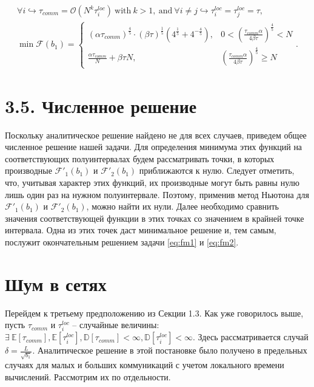 \documentclass{article}
\theoremstyle{definition}
\theoremstyle{plain}
\begin{document}
\begin{itemize}
\begin{equation}
    \label{eq:temp404}
    \begin{split}
    \forall i  \hookrightarrow \tau_{comm} = \mathcal{O}( N^k \tau_i^{loc}) ~\text{with}~ k >1 , ~\text{and}~ \forall i\neq j\hookrightarrow \tau_i^{loc} = \tau_j^{loc} = \tau,
    \\
    \min {\mathcal{F}}(b_1) = \begin{cases}
      (\alpha \tau_{comm})^\frac{4}{5}\cdot (\beta\tau)^\frac{1}{5}(4^\frac{1}{5} + 4^{-\frac{4}{5}}), & 0 < (\frac{\tau _{comm}\alpha}{4\beta\tau})^{\frac{4}{5}} < N\\
      \frac{\alpha\tau _{comm}}{N} + \beta \tau N , & (\frac{\tau _{comm}\alpha}{4\beta\tau})^{\frac{4}{5}} \geq N
    \end{cases}.
    \end{split}
\end{equation}
\end{itemize}

\section*{3.5. Численное решение}\label{eq:3.5}
Поскольку аналитическое решение найдено не для всех случаев, приведем общее численное решение нашей задачи. Для определения минимума этих функций на соответствующих полуинтервалах будем рассматривать точки, в которых производные $\mathcal{F'}_1(b_1)$ и $\mathcal{F'}_2(b_1)$ приближаются к нулю. Следует отметить, что, учитывая характер этих функций, их производные могут быть равны нулю лишь один раз на нужном полуинтервале. Поэтому, применив метод Ньютона \cite{polyak2007newton} для $\mathcal{F'}_1(b_1)$ и $\mathcal{F'}_2(b_1)$, можно найти их нули. Далее необходимо сравнить значения соответствующей функции в этих точках со значением в крайней точке интервала. Одна из этих точек даст минимальное решение и, тем самым, послужит окончательным решением задачи \eqref{eq:fm1} и \eqref{eq:fm2}.

\section{Шум в сетях}

Перейдем к третьему предположению из Секции 1.3. Как уже говорилось выше, пусть $\tau_{comm}$ и $\tau_i^{loc}$ -- случайные величины: $\exists ~\mathbb E [\tau_{comm}], \mathbb E [\tau_i^{loc}], \mathbb D [\tau_{comm}] < \infty, \mathbb D [\tau_i^{loc}] < \infty$. Здесь рассматривается случай $\delta = \frac{L}{\sqrt{b_1}}$. Аналитическое решение в этой постановке было получено в предельных случаях для малых и больших коммуникаций с учетом локального времени вычислений. Рассмотрим их по отдельности. 
\end{document}
